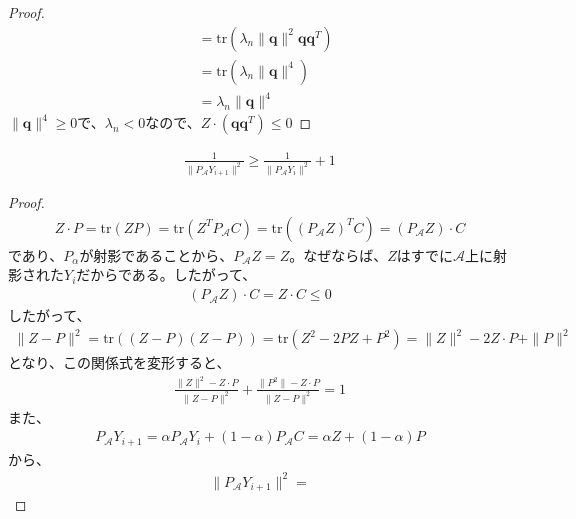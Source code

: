 \begin{proof}
\begin{align*}
                                      & = \mathrm{tr}(\lambda_n \|\mathbf{q}\|^2 \mathbf{q} \mathbf{q}^T) \\
                                      & = \mathrm{tr}(\lambda_n \|\mathbf{q}\|^4) \\
                                      & = \lambda_n \|\mathbf{q}\|^4
  \end{align*}
  $\|\mathbf{q}\|^4 \geq 0$で、$\lambda_n < 0$なので、$Z \cdot (\mathbf{q} \mathbf{q}^T) \leq 0$
\end{proof}

\begin{lemma*}
  \begin{align*}
    \frac{1}{\|P_\mathcal{A} Y_{i + 1}\|^2} \geq \frac{1}{\|P_\mathcal{A} Y_i\|^2} + 1
  \end{align*}
\end{lemma*}
\begin{proof}
  \begin{align*}
    Z \cdot P = \mathrm{tr}(Z P) = \mathrm{tr}(Z^T P_\mathcal{A} C) = \mathrm{tr}((P_\mathcal{A} Z)^T C) = (P_\mathcal{A} Z) \cdot C
  \end{align*}
  であり、$P_\alpha$が射影であることから、$P_\mathcal{A} Z = Z$。なぜならば、$Z$はすでに$\mathcal{A}$上に射影された$Y_i$だからである。したがって、
  \begin{align*}
    (P_\mathcal{A} Z) \cdot C = Z \cdot C \leq 0
  \end{align*}
  したがって、
  \begin{align*}
    \|Z - P\|^2 = \mathrm{tr}((Z - P)(Z - P)) = \mathrm{tr}(Z^2 - 2 P Z + P^2) = \|Z\|^2 - 2 Z \cdot P + \|P\|^2
  \end{align*}
  となり、この関係式を変形すると、
  \begin{align*}
    \frac{\|Z\|^2 - Z \cdot P}{\|Z - P\|^2} + \frac{\|P^2\| - Z \cdot P}{\|Z - P\|^2} = 1
  \end{align*}
  また、
  \begin{align*}
    P_\mathcal{A} Y_{i + 1} = \alpha P_\mathcal{A} Y_i + (1 - \alpha) P_\mathcal{A} C = \alpha Z + (1 - \alpha) P
  \end{align*}
  から、
  \begin{align*}
    \|P_\mathcal{A} Y_{i + 1}\|^2 = 
  \end{align*}
\end{proof}
